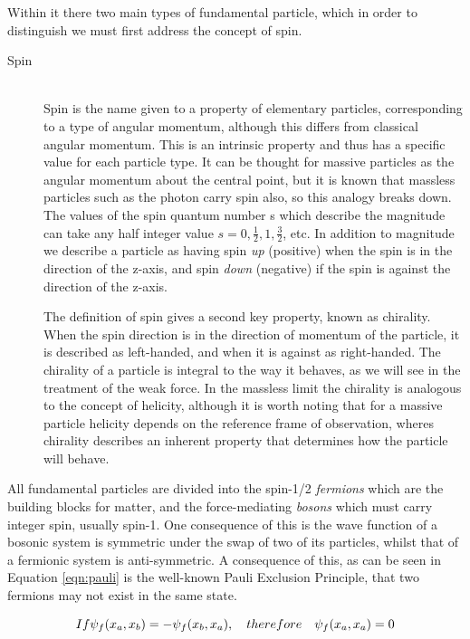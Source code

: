 Within it there two main types of fundamental particle, which in order to distinguish we must first address the concept of spin. 
\begin{description}
\item[Spin] \hfill \\
Spin is the name given to a property of elementary particles, corresponding to a type of angular momentum, although this differs from classical angular momentum. This is an intrinsic property and thus has a specific value for each particle type. It can be thought for massive particles as the angular momentum about the central point, but it is known that massless particles such as the photon carry spin also, so this analogy breaks down. The values of the spin quantum number s which describe the magnitude can take any half integer value $s=0, \frac{1}{2}, 1, \frac{3}{2}$, etc. In addition to magnitude we describe a particle as having spin \textit{up} (positive) when the spin is in the direction of the z-axis, and spin \textit{down} (negative) if the spin is against the direction of the z-axis. 

The definition of spin gives a second key property, known as chirality. When the spin direction is in the direction of momentum of the particle, it is described as left-handed, and when it is against as right-handed. The chirality of a particle is integral to the way it behaves, as we will see in the treatment of the weak force. In the massless limit  the chirality is analogous to the concept of helicity, although it is worth noting that for a massive particle helicity depends on the reference frame of observation, wheres chirality describes an inherent property that determines how the particle will behave.
\end{description}
All fundamental particles are divided into the spin-1/2 \textit{fermions} which are the building blocks for matter, and the force-mediating \textit{bosons} which must carry integer spin, usually spin-1. One consequence of this is the wave function of a bosonic system is symmetric under the swap of two of its particles, whilst that of a fermionic system is anti-symmetric. A consequence of this, as can be seen in Equation \ref{eqn:pauli} is the well-known Pauli Exclusion Principle, that two fermions may not exist in the same state. 

\begin{equation}
If \\ \psi_{f}(x_{a},x_{b}) = -\psi_{f}(x_{b},x_{a}), \quad therefore \quad \psi_{f}(x_{a},x_{a}) = 0
\label{eqn:pauli}
\end{equation}
 

